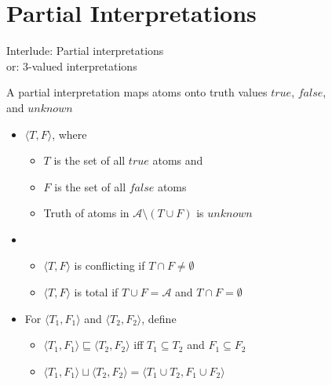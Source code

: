 \section{Partial Interpretations}
\begin{frame}{Interlude: Partial interpretations\\\normalsize
    or: 3-valued interpretations}
  
  A \alert{partial interpretation} maps atoms onto truth values 
  \alert{$\mathit{true}$}, \alert{$\mathit{false}$},\\ and \alert{$\mathit{unknown}$}
  \begin{itemize}
  \item<2->  $\langle T,F \rangle$, where
    \begin{itemize}
    \item $T$ is the set of all $\mathit{true}$ atoms and
    \item $F$ is the set of all $\mathit{false}$ atoms
    \item Truth of atoms in $\mathcal{A} \setminus (T \cup F)$ is $\mathit{unknown}$
    \end{itemize}
  \item<3-> 
    \begin{itemize}
    \item $\langle T,F \rangle$ is \alert{conflicting} if $T \cap F\neq\emptyset$
    \item $\langle T,F \rangle$ is \alert{total} if $T \cup F = \mathcal{A}$ and $T \cap F=\emptyset$
    \end{itemize}
  \item<4-> 
    For $\langle T_1,F_1\rangle$ and $\langle T_2,F_2\rangle$, define
    \begin{itemize}
    \item $\langle T_1,F_1\rangle \sqsubseteq \langle T_2,F_2\rangle$
      iff
      $T_1\subseteq T_2$ and $F_1\subseteq F_2$
    \item $\langle T_1,F_1\rangle \sqcup \langle T_2,F_2\rangle =
      \langle T_1 \cup T_2, F_1 \cup F_2 \rangle$
    \end{itemize}
  \end{itemize}
\end{frame}
